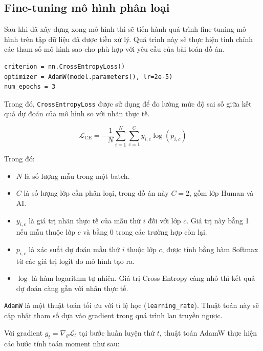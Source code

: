 \subsection{Fine-tuning mô hình phân loại}
Sau khi đã xây dựng xong mô hình thì sẽ tiến hành quá trình fine-tuning mô hình trên tập dữ liệu đã được tiền xử lý. Quá trình này sẽ thực hiện tinh chỉnh các tham số mô hình
sao cho phù hợp với yêu cầu của bài toán đồ án.

\begin{lstlisting}[style=pythoncode]
criterion = nn.CrossEntropyLoss()
optimizer = AdamW(model.parameters(), lr=2e-5)
num_epochs = 3 
\end{lstlisting}

Trong đó, \texttt{CrossEntropyLoss} được sử dụng để đo lường mức độ sai số giữa kết quả dự đoán của mô hình so với nhãn thực tế.

\begin{equation}
    \mathcal{L}_{\mathrm{CE}} = -\frac{1}{N} \sum_{i=1}^{N} \sum_{c=1}^{C} y_{i,c} \log\left(p_{i,c}\right)
\end{equation}


Trong đó:
\begin{itemize}
    \item $N$ là số lượng mẫu trong một batch.
    \item $C$ là số lượng lớp cần phân loại, trong đồ án này $C=2$, gồm lớp Human và AI.
    \item $y_{i,c}$ là giá trị nhãn thực tế của mẫu thứ $i$ đối với lớp $c$. Giá trị này bằng 1 nếu mẫu thuộc lớp $c$ và bằng 0 trong các trường hợp còn lại.
    \item $p_{i,c}$ là xác suất dự đoán mẫu thứ $i$ thuộc lớp $c$, được tính bằng hàm Softmax từ các giá trị logit do mô hình tạo ra.
    \item $\log$ là hàm logarithm tự nhiên. Giá trị Cross Entropy càng nhỏ thì kết quả dự đoán càng gần với nhãn thực tế.
\end{itemize}

\texttt{AdamW} là một thuật toán tối ưu với tỉ lệ học (\texttt{learning\_rate}). Thuật toán này sẽ cập nhật tham số dựa vào gradient trong quá trình lan truyền ngược.

Với gradient $g_t = \nabla_{\theta}\mathcal{L}_t$ tại bước huấn luyện thứ $t$, thuật toán AdamW thực hiện các bước tính toán moment như sau:

